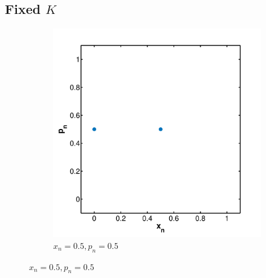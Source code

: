 
\subsection{Fixed $K$}





\begin{figure}
	\centering
	\begin{subfigure}{0.9\columnwidth}
		\centering
		\includegraphics[width=\textwidth]{./img/assignment_a_0_dim}
		\caption{$x_n = 0.5, p_n = 0.5$}
		\label{fig:experiment:dimension:zero}
	\end{subfigure}


\end{figure}
